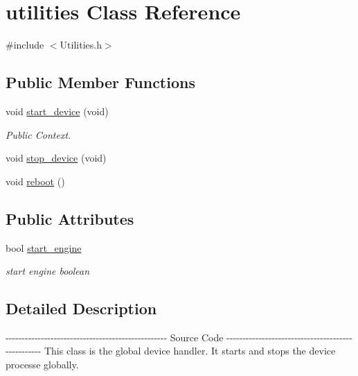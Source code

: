 \hypertarget{classutilities}{\section{utilities \-Class \-Reference}
\label{classutilities}
}


{\ttfamily \#include $<$\-Utilities.\-h$>$}

\subsection*{\-Public \-Member \-Functions}
\begin{DoxyCompactItemize}
\item 
void \hyperlink{classutilities_a6a73417a57d656f15410ad19ea44b439}{start\-\_\-device} (void)
\begin{DoxyCompactList}\small\item\em \-Public \-Context. \end{DoxyCompactList}\item 
void \hyperlink{classutilities_a6c3debc29d468cfc137138a0284104e2}{stop\-\_\-device} (void)
\item 
void \hyperlink{classutilities_a0c34ffbd0eee5f95f331cdabac4b601b}{reboot} ()
\end{DoxyCompactItemize}
\subsection*{\-Public \-Attributes}
\begin{DoxyCompactItemize}
\item 
bool \hyperlink{classutilities_a00ad17c59af67ff895854c2510407513}{start\-\_\-engine}
\begin{DoxyCompactList}\small\item\em start engine boolean \end{DoxyCompactList}\end{DoxyCompactItemize}


\subsection{\-Detailed \-Description}
-\/-\/-\/-\/-\/-\/-\/-\/-\/-\/-\/-\/-\/-\/-\/-\/-\/-\/-\/-\/-\/-\/-\/-\/-\/-\/-\/-\/-\/-\/-\/-\/-\/-\/-\/-\/-\/-\/-\/-\/-\/-\/-\/-\/-\/-\/-\/-\/-\/-\/ \-Source \-Code -\/-\/-\/-\/-\/-\/-\/-\/-\/-\/-\/-\/-\/-\/-\/-\/-\/-\/-\/-\/-\/-\/-\/-\/-\/-\/-\/-\/-\/-\/-\/-\/-\/-\/-\/-\/-\/-\/-\/-\/-\/-\/-\/-\/-\/-\/-\/-\/-\/-\/ \-This class is the global device handler. \-It starts and stops the device processe globally. 

